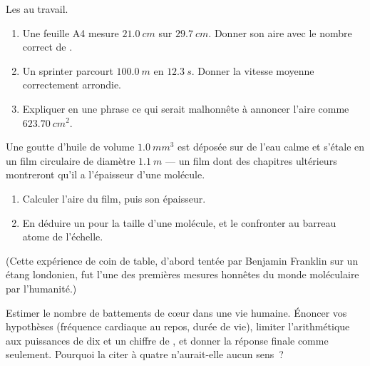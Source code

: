 \begin{exercise}[$\star\star$]\label{exo:g10:orders-of-magnitude:11}
Les  au travail.
\begin{enumerate}
  \item Une feuille A4 mesure $\qty{21.0}{cm}$ sur $\qty{29.7}{cm}$.
        Donner son aire avec le nombre correct de .
  \item Un sprinter parcourt $\qty{100.0}{m}$ en $\qty{12.3}{s}$.
        Donner la vitesse moyenne correctement arrondie.
  \item Expliquer en une phrase ce qui serait malhonnête à annoncer
        l'aire comme $\qty{623.70}{cm^2}$.
\end{enumerate}
\end{exercise}

\begin{exercise}[$\star\star\star$]\label{exo:g10:orders-of-magnitude:12}
Une goutte d'huile de volume $\qty{1.0}{mm^3}$ est déposée sur de l'eau
calme et s'étale en un film circulaire de diamètre $\qty{1.1}{m}$ ---
un film dont des chapitres ultérieurs montreront qu'il a l'épaisseur
d'une molécule.
\begin{enumerate}
  \item Calculer l'aire du film, puis son épaisseur.
  \item En déduire un  pour la taille d'une
        molécule, et le confronter au barreau atome de l'échelle.
\end{enumerate}
(Cette expérience de coin de table, d'abord tentée par Benjamin
Franklin sur un étang londonien, fut l'une des premières mesures
honnêtes du monde moléculaire par l'humanité.)
\end{exercise}

\begin{exercise}[$\star\star\star$]\label{exo:g10:orders-of-magnitude:13}
Estimer le nombre de battements de cœur dans une vie humaine. Énoncer
vos hypothèses (fréquence cardiaque au repos, durée de vie), limiter
l'arithmétique aux puissances de dix et un chiffre de , et
donner la réponse finale comme  seulement.
Pourquoi la citer à quatre  n'aurait-elle
aucun sens~?
\end{exercise}


